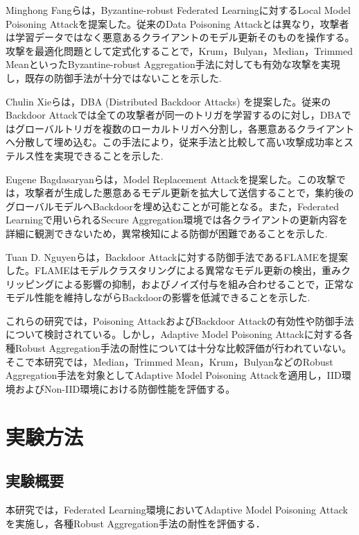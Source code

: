 \documentclass[a4j, twocolumn, dvipdfmx]{jsarticle}  %
\begin{document}
Minghong Fangらは，Byzantine-robust Federated Learningに対するLocal Model Poisoning Attackを提案した。従来のData Poisoning Attackとは異なり，攻撃者は学習データではなく悪意あるクライアントのモデル更新そのものを操作する。攻撃を最適化問題として定式化することで，Krum，Bulyan，Median，Trimmed MeanといったByzantine-robust Aggregation手法に対しても有効な攻撃を実現し，既存の防御手法が十分ではないことを示した\cite{fang2020local}.

Chulin Xieらは，DBA (Distributed Backdoor Attacks) を提案した。従来のBackdoor Attackでは全ての攻撃者が同一のトリガを学習するのに対し，DBAではグローバルトリガを複数のローカルトリガへ分割し，各悪意あるクライアントへ分散して埋め込む。この手法により，従来手法と比較して高い攻撃成功率とステルス性を実現できることを示した\cite{xie2020dba}.

Eugene Bagdasaryanらは，Model Replacement Attackを提案した。この攻撃では，攻撃者が生成した悪意あるモデル更新を拡大して送信することで，集約後のグローバルモデルへBackdoorを埋め込むことが可能となる。また，Federated Learningで用いられるSecure Aggregation環境では各クライアントの更新内容を詳細に観測できないため，異常検知による防御が困難であることを示した\cite{bagdasaryan2020model}.

Tuan D. Nguyenらは，Backdoor Attackに対する防御手法であるFLAMEを提案した。FLAMEはモデルクラスタリングによる異常なモデル更新の検出，重みクリッピングによる影響の抑制，およびノイズ付与を組み合わせることで，正常なモデル性能を維持しながらBackdoorの影響を低減できることを示した\cite{nguyen2022flame}.

これらの研究では，Poisoning AttackおよびBackdoor Attackの有効性や防御手法について検討されている。しかし，Adaptive Model Poisoning Attackに対する各種Robust Aggregation手法の耐性については十分な比較評価が行われていない。そこで本研究では，Median，Trimmed Mean，Krum，BulyanなどのRobust Aggregation手法を対象としてAdaptive Model Poisoning Attackを適用し，IID環境およびNon-IID環境における防御性能を評価する。




\section{実験方法}

\subsection{実験概要}

本研究では，Federated Learning環境においてAdaptive Model Poisoning Attackを実施し，各種Robust Aggregation手法の耐性を評価する．
\end{document}
